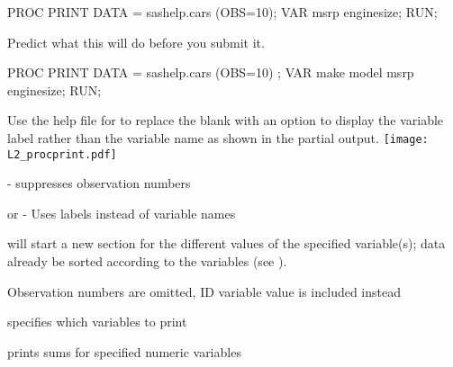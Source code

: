 \begin{frame}[fragile]
\footnotesize
\begin{code}{.0}
PROC PRINT DATA = sashelp.cars (OBS=10);
	VAR msrp enginesize;
RUN;
\end{code}
\emp
\vskip20pt
\oyo Predict what this will do before you submit it.
\end{frame}



\begin{frame}[fragile]
\footnotesize
\begin{code}{.0}
PROC PRINT DATA = sashelp.cars (OBS=10) \textcolor{OrangeRed}{\underline{\hspace{0.5in}}};
	VAR make model msrp enginesize;
RUN;
\end{code}
\emp
\vskip20pt
\oyo Use the help file for  to replace the blank with an option to display the variable label rather than the variable name as shown in the partial output.
\vskip10pt
\texttt{[image: L2\_procprint.pdf]}
\end{frame}



\begin{frame}
\bi
\item {} - suppresses observation numbers
\item {} or  - Uses labels instead of variable names
\item {}
	\bi
	\item will start a new section for the different values of the specified
variable(s); data  already be sorted according to the  variables (see ).
	\ei
\item {}
	\bi
	\item Observation numbers are omitted, ID variable value is included instead
	\ei
\item {}
	\bi
	\item specifies which variables to print
	\ei
\item {}
	\bi
	\item prints sums for specified numeric variables
	\ei
\ei
\end{frame}


